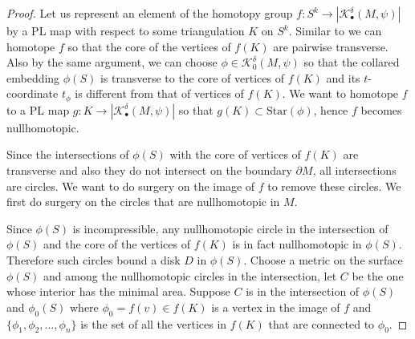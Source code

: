 \documentclass[a4paper]{amsart}
\theoremstyle{definition}
\theoremstyle{remark}
\numberwithin{equation}{section}
\begin{document}
 \begin{proof}
Let us represent an element of the homotopy group $f:S^k\to |\mathcal{K}^{\delta}_{\bullet}(M,\psi)|$ by a PL map with respect to some triangulation $K$ on $S^k$. Similar to  we can homotope $f$ so that the core of the vertices of $f(K)$ are pairwise transverse. Also by the same argument, we can choose $\phi\in \mathcal{K}^{\delta}_{0}(M,\psi)$ so that the collared embedding $\phi(S)$ is transverse to the core of vertices of $f(K)$ and its $t$-coordinate $t_{\phi}$ is different from that of vertices of $f(K)$. We want to homotope $f$ to a PL map $g:K\to |\mathcal{K}^{\delta}_{\bullet}(M,\psi)|$ so that $g(K)\subset \text{Star}(\phi)$, hence $f$ becomes nullhomotopic. 

Since the intersections of $\phi(S)$ with the core of vertices of $f(K)$ are transverse and also they do not intersect on the boundary $\partial M$, all intersections are circles. We want to do surgery on the image of $f$ to remove these circles. We first do surgery on the circles that are nullhomotopic in $M$.

 Since $\phi(S)$ is incompressible, any nullhomotopic circle in the intersection of  $\phi(S)$ and the core of the vertices of $f(K)$ is in fact nullhomotopic in $\phi(S)$. Therefore such circles bound  a disk $D$ in $\phi(S)$. Choose a metric on the surface $\phi(S)$ and among the nullhomotopic circles in the intersection, let $C$ be the one whose interior has  the minimal area. Suppose $C$ is in the intersection of $\phi(S)$ and $\phi_0(S)$ where $\phi_0=f(v)\in f(K)$ is a vertex in the image of $f$ and $\{\phi_1,\phi_2,\dots, \phi_n\}$ is the set of all the vertices in $f(K)$ that are connected to $\phi_0$.


\end{proof}
\end{document}
